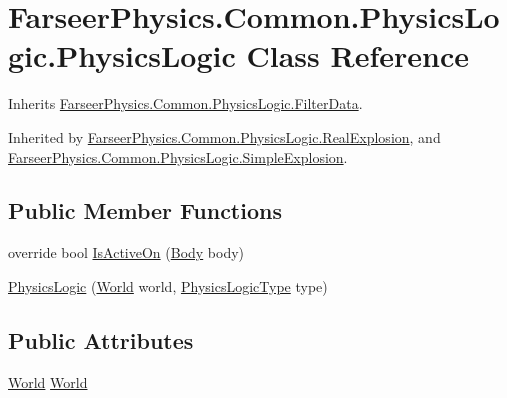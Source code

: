 \hypertarget{class_farseer_physics_1_1_common_1_1_physics_logic_1_1_physics_logic}{\section{Farseer\+Physics.\+Common.\+Physics\+Logic.\+Physics\+Logic Class Reference}
\label{class_farseer_physics_1_1_common_1_1_physics_logic_1_1_physics_logic}
}


Inherits \hyperlink{class_farseer_physics_1_1_common_1_1_physics_logic_1_1_filter_data}{Farseer\+Physics.\+Common.\+Physics\+Logic.\+Filter\+Data}.



Inherited by \hyperlink{class_farseer_physics_1_1_common_1_1_physics_logic_1_1_real_explosion}{Farseer\+Physics.\+Common.\+Physics\+Logic.\+Real\+Explosion}, and \hyperlink{class_farseer_physics_1_1_common_1_1_physics_logic_1_1_simple_explosion}{Farseer\+Physics.\+Common.\+Physics\+Logic.\+Simple\+Explosion}.

\subsection*{Public Member Functions}
\begin{DoxyCompactItemize}
\item 
override bool \hyperlink{class_farseer_physics_1_1_common_1_1_physics_logic_1_1_physics_logic_a33921a532cb4382f0943a692882351b6}{Is\+Active\+On} (\hyperlink{class_farseer_physics_1_1_dynamics_1_1_body}{Body} body)
\item 
\hyperlink{class_farseer_physics_1_1_common_1_1_physics_logic_1_1_physics_logic_a6302a738a8af0f6964a3ba318f6e6541}{Physics\+Logic} (\hyperlink{class_farseer_physics_1_1_dynamics_1_1_world}{World} world, \hyperlink{namespace_farseer_physics_1_1_common_1_1_physics_logic_a2d07851d80889d4aae171f9d9fc81feb}{Physics\+Logic\+Type} type)
\end{DoxyCompactItemize}
\subsection*{Public Attributes}
\begin{DoxyCompactItemize}
\item 
\hyperlink{class_farseer_physics_1_1_dynamics_1_1_world}{World} \hyperlink{class_farseer_physics_1_1_common_1_1_physics_logic_1_1_physics_logic_a9956c78b10bc30276793f19f0e181c2a}{World}
\end{DoxyCompactItemize}


